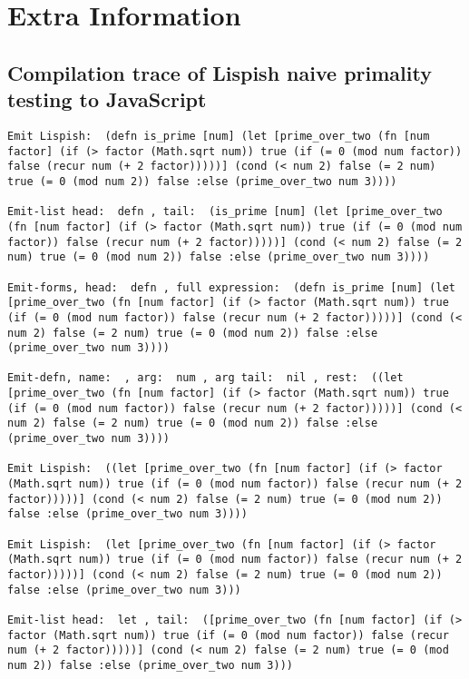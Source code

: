 

\chapter{Extra Information}
\section{Compilation trace of Lispish naive primality testing to JavaScript}\label{primality-trace-appendix}
\begin{verbatim}
Emit Lispish:  (defn is_prime [num] (let [prime_over_two (fn [num factor] (if (> factor (Math.sqrt num)) true (if (= 0 (mod num factor)) false (recur num (+ 2 factor)))))] (cond (< num 2) false (= 2 num) true (= 0 (mod num 2)) false :else (prime_over_two num 3))))

Emit-list head:  defn , tail:  (is_prime [num] (let [prime_over_two (fn [num factor] (if (> factor (Math.sqrt num)) true (if (= 0 (mod num factor)) false (recur num (+ 2 factor)))))] (cond (< num 2) false (= 2 num) true (= 0 (mod num 2)) false :else (prime_over_two num 3))))

Emit-forms, head:  defn , full expression:  (defn is_prime [num] (let [prime_over_two (fn [num factor] (if (> factor (Math.sqrt num)) true (if (= 0 (mod num factor)) false (recur num (+ 2 factor)))))] (cond (< num 2) false (= 2 num) true (= 0 (mod num 2)) false :else (prime_over_two num 3))))

Emit-defn, name:  , arg:  num , arg tail:  nil , rest:  ((let [prime_over_two (fn [num factor] (if (> factor (Math.sqrt num)) true (if (= 0 (mod num factor)) false (recur num (+ 2 factor)))))] (cond (< num 2) false (= 2 num) true (= 0 (mod num 2)) false :else (prime_over_two num 3))))

Emit Lispish:  ((let [prime_over_two (fn [num factor] (if (> factor (Math.sqrt num)) true (if (= 0 (mod num factor)) false (recur num (+ 2 factor)))))] (cond (< num 2) false (= 2 num) true (= 0 (mod num 2)) false :else (prime_over_two num 3))))

Emit Lispish:  (let [prime_over_two (fn [num factor] (if (> factor (Math.sqrt num)) true (if (= 0 (mod num factor)) false (recur num (+ 2 factor)))))] (cond (< num 2) false (= 2 num) true (= 0 (mod num 2)) false :else (prime_over_two num 3)))

Emit-list head:  let , tail:  ([prime_over_two (fn [num factor] (if (> factor (Math.sqrt num)) true (if (= 0 (mod num factor)) false (recur num (+ 2 factor)))))] (cond (< num 2) false (= 2 num) true (= 0 (mod num 2)) false :else (prime_over_two num 3)))


\end{verbatim}
